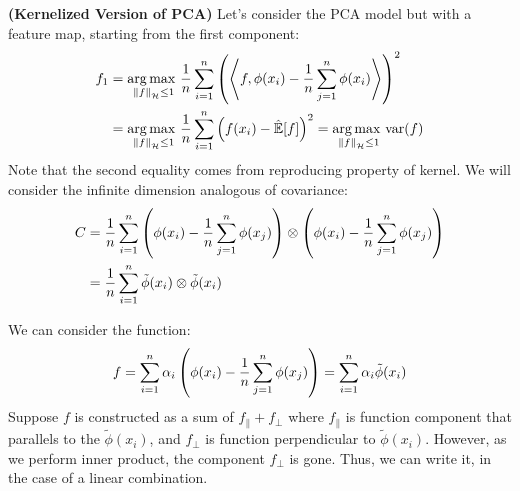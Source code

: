 \begin{definition}{\textbf{(Kernelized Version of PCA)}}
    Let's consider the PCA model but with a feature map, starting from the first component:
    \begin{equation*}
    \begin{aligned}
        f_1 &= \underset{\left\lVert f\right\rVert_\mathcal{H}\le1}{\arg\max \ }\frac{1}{n}\sum^n_{i=1}\left( \left\langle f, \phi(x_i) - \frac{1}{n}\sum^n_{j=1}\phi(x_i) \right\rangle \right)^2 \\ 
        &= \underset{\left\lVert f\right\rVert_\mathcal{H}\le1}{\arg\max \ }\frac{1}{n}\sum^n_{i=1}\left( f(x_i) - \hat{\mathbb{E}}[f] \right)^2 = \underset{\left\lVert f\right\rVert_\mathcal{H}\le1}{\arg\max \ }\text{var}(f)
    \end{aligned}
    \end{equation*}
    Note that the second equality comes from reproducing property of kernel. We will consider the infinite dimension analogous of covariance:
    \begin{equation*}
    \begin{aligned}
        C &= \frac{1}{n}\sum^n_{i=1}\left( \phi(x_i) - \frac{1}{n}\sum^n_{j=1}\phi(x_j) \right)\otimes\left( \phi(x_i) - \frac{1}{n}\sum^n_{j=1}\phi(x_j) \right) \\ 
        &= \frac{1}{n}\sum^n_{i=1}\tilde{\phi}(x_i)\otimes\tilde{\phi}(x_i)
    \end{aligned}
    \end{equation*}
\end{definition}

\begin{remark}
    We can consider the function: 
    \begin{equation*}
        f = \sum^n_{i=1}\alpha_i\left( \phi(x_i)-\frac{1}{n}\sum^n_{j=1}\phi(x_j) \right)=\sum_{i=1}^n\alpha_i\tilde{\phi}(x_i)
    \end{equation*} 
    Suppose $f$ is constructed as a sum of $f_{\|} + f_\bot$ where $f_{\|}$ is function component that parallels to the $\tilde{\phi}(x_i)$, and $f_\bot$ is function perpendicular to $\tilde{\phi}(x_i)$. However, as we perform inner product, the component $f_\bot$ is gone. Thus, we can write it, in the case of a linear combination.
\end{remark}

